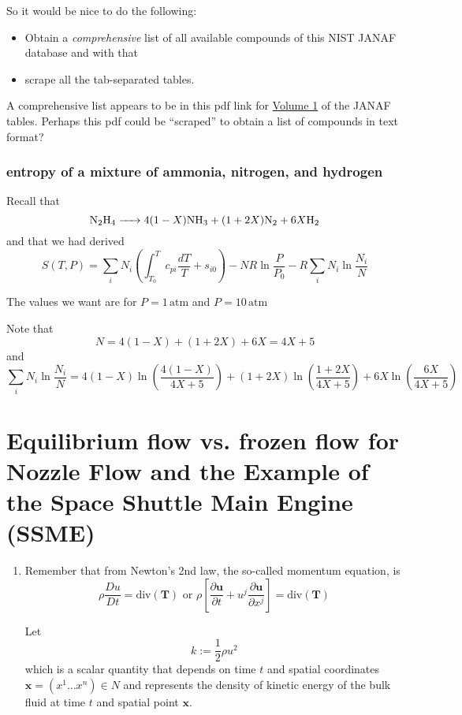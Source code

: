 \documentclass[10pt]{amsart}
\begin{document}
\begin{multicols*}{2}
So it would be nice to do the following:
\begin{itemize}
  \item Obtain a \emph{comprehensive} list of all available compounds of this NIST JANAF database and with that 
  \item scrape all the tab-separated tables.  
\end{itemize}
A comprehensive list appears to be in this pdf link for \href{http://kinetics.nist.gov/janaf/pdf/JANAF-FourthEd-1998-1Vol1-Intro.pdf}{Volume 1} of the JANAF tables.  Perhaps this pdf could be ``scraped'' to obtain a list of compounds in text format?  



\subsubsection{entropy of a mixture of ammonia, nitrogen, and hydrogen}

Recall that 
\[
\ce{N2H4 -> } 4(1-X) \ce{NH3} + (1+2X) \ce{N2} + 6X \ce{H2}
\]
and that we had derived
\[
S(T,P) = \sum_i N_i \left( \int_{T_0}^T c_{pi} \frac{dT}{T} + s_{i0} \right) - NR \ln{ \frac{P}{P_0} } - R \sum_i N_i \ln{ \frac{N_i}{N} }
\]

The values we want are for $P = 1 \, \text{atm}$ and $P=10 \, \text{atm}$  

Note that 
\[
N=4(1-X) + (1+2X) + 6X = 4X +5
\]
and 
\[
\sum_i N_i \ln{\frac{N_i}{N} } = 4(1-X) \ln{ \left( \frac{4(1-X)}{4X+5} \right) } + (1+2X)\ln{ \left( \frac{1+2X}{4X+5} \right) } + 6X \ln{ \left( \frac{6X}{4X+5} \right) }
\]


\section{Equilibrium flow vs. frozen flow for Nozzle Flow and the Example of the Space Shuttle Main Engine (SSME)}

\begin{enumerate}
  \item Remember that from Newton's 2nd law, the so-called momentum equation, is 
\[
  \rho \frac{Du}{Dt}  = \text{div}(\mathbf{T}) \text{ or } \rho \left[ \frac{ \partial \mathbf{u} }{ \partial t} + u^j \frac{ \partial \mathbf{u} }{ \partial x^j} \right] = \text{div}(\mathbf{T})
\]

Let 
\begin{equation}
  k := \frac{1}{2} \rho u^2 
\end{equation}
which is a scalar quantity that depends on time $t$ and spatial coordinates $\mathbf{x} = (x^1 \dots x^n) \in N$ and represents the density of kinetic energy of the bulk fluid at time $t$ and spatial point $\mathbf{x}$.  


\end{enumerate}
\end{multicols*}
\end{document}
